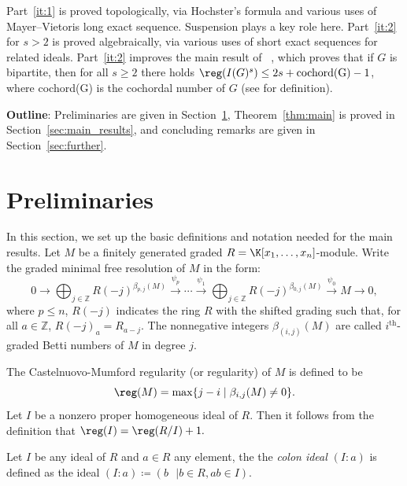 Part~\ref{it:1} is proved topologically, via Hochster's formula and various uses of Mayer--Vietoris long exact sequence. Suspension plays a key role here. Part~\ref{it:2} for $s>2$ is proved algebraically, via various uses of short exact sequences for related ideals. Part~\ref{it:2} improves the main result of ~\cite{jayanthan}, which proves that if $G$ is bipartite, then for all $s\geq 2$  there holds $\reg(I(G)^s) \leq 2s+\text{cochord(G)}-1$, where cochord(G) is the cochordal number of $G$ (see \cite{jayanthan} for definition).

\textbf{Outline}: Preliminaries are given in Section~\ref{pre}, Theorem~\ref{thm:main} is proved in Section~\ref{sec:main_results}, and concluding remarks are given in Section~\ref{sec:further}.


\section{Preliminaries}\label{pre}
  In this section, we set up the basic definitions and notation needed for the main results. Let $M$ be a finitely generated graded $R=\K[x_1,\ldots,x_n]$-module.
Write the graded minimal free resolution of $M$ in the form:
\[
  0 \longrightarrow \bigoplus_{j \in \mathbb{Z}} R(-j)^{\beta_{p,j}(M)}
\overset{\psi_{p}}{\longrightarrow} \cdots \overset{\psi_1}{\longrightarrow}
\bigoplus_{j \in \mathbb{Z}} R(-j)^{\beta_{0,j}(M)}
\overset{\psi_0}{\longrightarrow} M\longrightarrow 0,
 \]
 where $p \leq n$, $R(-j)$ indicates the ring $R$ with the
shifted grading such that, for all $a \in \mathbb{Z}$, $R(-j)_{a}=R_{a-j}$.
The nonnegative integers $\beta_{(i,j)}(M)$ are called 
$i^{\text{th}}$-graded Betti numbers of $M$ in degree $j$.

The Castelnuovo-Mumford regularity (or regularity) of $M$ is defined to be
\[
 \reg(M)=\max\{j-i \mid \beta_{i,j}(M)\neq 0\}.\label{def_reg}
\]
  Let $I$ be a nonzero proper homogeneous ideal of $R$.
Then it follows from the definition
that $\reg(I) = \reg(R/I)+1.$

Let $I$ be any ideal of $R$ and $a\in R$ any element, the the \emph{colon ideal} $(I:a)$ is defined as the ideal $(I:a)\coloneqq (b \text{ } | b\in R, ab\in I)$.

